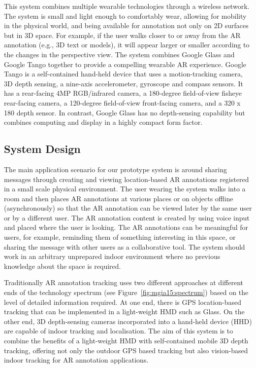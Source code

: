 This system combines multiple wearable technologies through a wireless network. The system is small and light enough to comfortably wear, allowing for mobility in the physical world, and being available for annotation not only on 2D surfaces but in 3D space. For example, if the user walks closer to or away from the AR annotation (e.g., 3D text or models), it will appear larger or smaller according to the changes in the perspective view. The system combines Google Glass and Google Tango together to provide a compelling wearable AR experience. Google Tango is a self-contained hand-held device that uses a motion-tracking camera, 3D depth sensing, a nine-axis accelerometer, gyroscope and compass sensors. It has a rear-facing 4MP RGB/infrared camera, a 180-degree field-of-view fisheye rear-facing camera, a 120-degree field-of-view front-facing camera, and a 320 x 180 depth sensor. In contrast, Google Glass has no depth-sensing capability but combines computing and display in a highly compact form factor. 



\subsection{System Design}

The main application scenario for our prototype system is around sharing messages through creating and viewing location-based AR annotations registered in a small scale physical environment. The user wearing the system walks into a room and then places AR annotations at various places or on objects offline (asynchronously) so that the AR annotation can be viewed later by the same user or by a different user. The AR annotation content is created by using voice input and placed where the user is looking. The AR annotations can be meaningful for users, for example, reminding them of something interesting in this space, or sharing the message with other users as a collaborative tool. The system should work in an arbitrary unprepared indoor environment where no previous knowledge about the space is required. 

Traditionally AR annotation tracking uses two different approaches at different ends of the technology spectrum (see Figure~\ref{fig:mgia15:spectrum}) based on the level of detailed information required. At one end, there is GPS location-based tracking that can be implemented in a light-weight HMD such as Glass. On the other end, 3D depth-sensing cameras incorporated into a hand-held device (HHD) are capable of indoor tracking and localisation. The aim of this system is to combine the benefits of a light-weight HMD with self-contained mobile 3D depth tracking, offering not only the outdoor GPS based tracking but also vision-based indoor tracking for AR annotation applications. 

